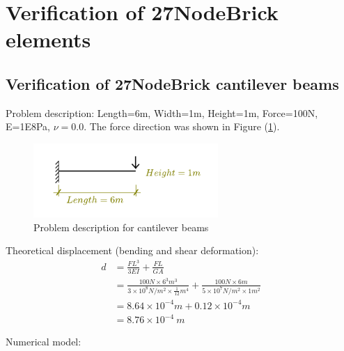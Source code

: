 \documentclass[fleqn,11pt,letter]{article}
\begin{document}
\section{Verification of 27NodeBrick elements}
\subsection{Verification of 27NodeBrick cantilever beams}






Problem description: Length=6m, Width=1m, Height=1m, Force=100N, E=1E8Pa, $\nu=0.0$. The force direction was shown in Figure (\ref{fig Problem description for cantilever 27}). 

\begin{figure}[H]
  \centering
  \includegraphics[width=7cm]{../Figure_files/27NodeBrick/cantilever_6.pdf}
  \caption{Problem description for cantilever beams}
  \label{fig Problem description for cantilever 27}
\end{figure}


Theoretical displacement (bending and shear deformation):
\begin{equation}
  \begin{aligned}
  d &=\frac{FL^3}{3EI}+\frac{FL}{GA} \\ 
    &= \frac{100 N \times 6^3 m^3}{3\times 10^8 N/m^2 \times \frac{1}{12} m^4}+ 
    \frac{100 N\times 6 m}{5\times 10^7 N/m^2\times 1 m^2} \\ 
    &=8.64\times 10^{-4} m + 0.12 \times 10^{-4} m  \\
   & =8.76\times 10^{-4} \ m
   \end{aligned}
\end{equation}



Numerical model:
\end{document}
